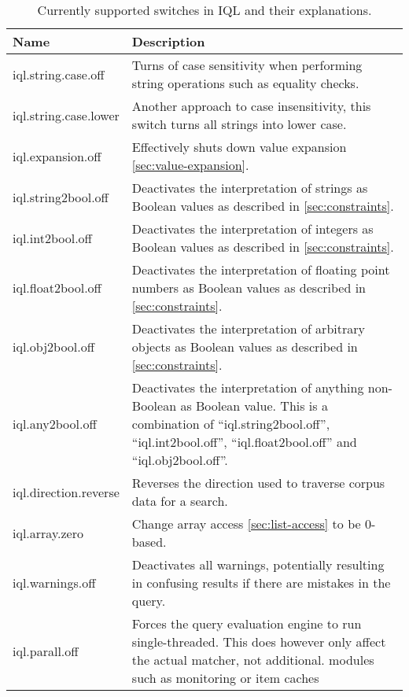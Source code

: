 \documentclass[11pt]{article}
\newcommand{\iql}{IQL\xspace}
\begin{document}
\begin{table}[h]
\noindent\begin{tabular}{|p{}|p{}|}
\hline 
Name	& Description \\ 
\hline 
\hline
iql.string.case.off         & Turns of case sensitivity when performing string operations such as equality checks.  \\ 
\hline
iql.string.case.lower       & Another approach to case insensitivity, this switch turns all strings into lower case.  \\ 
\hline
iql.expansion.off           & Effectively shuts down value expansion \cref{sec:value-expansion}.  \\ 
\hline
iql.string2bool.off         & Deactivates the interpretation of strings as Boolean values as described in \cref{sec:constraints}.  \\ 
\hline
iql.int2bool.off            & Deactivates the interpretation of integers as Boolean values as described in \cref{sec:constraints}.  \\ 
\hline
iql.float2bool.off          & Deactivates the interpretation of floating point numbers as Boolean values as described in \cref{sec:constraints}.  \\ 
\hline
iql.obj2bool.off            & Deactivates the interpretation of arbitrary objects as Boolean values as described in \cref{sec:constraints}.  \\ 
\hline
iql.any2bool.off            & Deactivates the interpretation of anything non-Boolean as Boolean value. This is a combination of ``iql.string2bool.off'', ``iql.int2bool.off'', ``iql.float2bool.off'' and  ``iql.obj2bool.off''.  \\ 
\hline
iql.direction.reverse       & Reverses the direction used to traverse corpus data for a search.  \\ 
\hline
iql.array.zero              & Change array access \cref{sec:list-access} to be 0-based.  \\ 
\hline
iql.warnings.off            & Deactivates all warnings, potentially resulting in confusing results if there are mistakes in the query.  \\ 
\hline
iql.parall.off			  & Forces the query evaluation engine to run single-threaded. This does however only affect the actual matcher, not additional. modules such as monitoring or item caches  \\ 
\hline
\end{tabular}
\label{tab:switches}
\caption{Currently supported switches in \iql and their explanations.}
\end{table}
\end{document}
